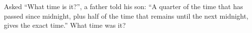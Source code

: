 Asked ``What time is it?'', a father told his son: ``A quarter of the time that has passed since midnight, plus half of the time that remains until the next midnight, gives the exact time.'' What time was it?
